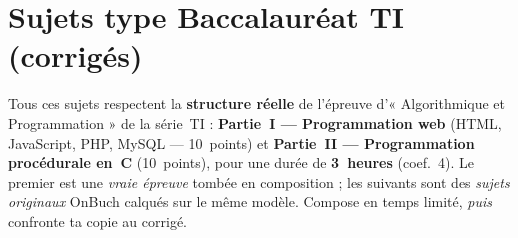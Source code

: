 \chapter{Sujets type Baccalauréat TI (corrigés)}

\noindent Tous ces sujets respectent la \textbf{structure réelle} de l'épreuve
d'« Algorithmique et Programmation » de la série~TI : \textbf{Partie~I — Programmation
web} (HTML, JavaScript, PHP, MySQL — 10~points) et \textbf{Partie~II — Programmation
procédurale en~C} (10~points), pour une durée de \textbf{3~heures} (coef.~4).
Le premier est une \emph{vraie épreuve} tombée en composition ; les suivants sont des
\emph{sujets originaux} OnBuch calqués sur le même modèle. Compose en temps limité,
\emph{puis} confronte ta copie au corrigé.


\clearpage

\clearpage

\clearpage

\clearpage

\clearpage

